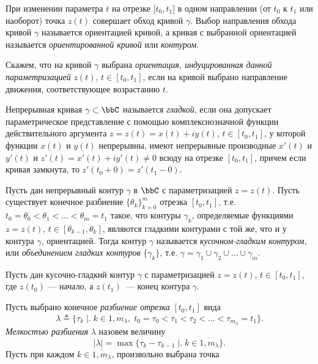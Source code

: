 При изменении параметра $t$ на отрезке $[t_0 , t_1$] в одном направлении (от $t_0$ к $t_1$ или наоборот) точка $z(t)$ совершает обход кривой $\gamma$. Выбор направления обхода кривой $\gamma$ называется ориентацией кривой, а кривая с выбранной ориентацией называется \textit{ориентированной кривой} или \textit{контуром}.

Скажем, что на кривой $\gamma$ выбрана \textit{ориентация, индуцированная данной параметризацией} $z(t)$, $t \in[t_0 , t_1]$, если на кривой выбрано направление движения, соответствующее возрастанию $t$. 

\begin{defn}
Непрерывная кривая $\gamma \subset \bbC$ называется \textit{гладкой}, если она допускает параметрическое представление с помощью комплекснозначной функции действительного аргумента $z = z(t) = x(t) + iy(t)$, $t \in [t_0 , t_1]$, у которой функции $x(t)$ и $y(t)$ непрерывны, имеют непрерывные производные $x'(t)$ и $y'(t)$ и $z'(t) = x'(t) +iy'(t) \ne 0$ всюду на отрезке $[t_0 , t_1]$, причем если кривая замкнута, то $z'(t_0 +0)= z'(t_1 - 0)$.
\end{defn}

\begin{defn}
Пусть дан непрерывный контур $\gamma$ в $\bbC$ с параметризацией $z =z(t)$. Пусть существует конечное разбиение $\{\theta_k\}^m_{k=0}$ отрезка $[t_0 , t_1]$, т.е. $t_0 = \theta_0 < \theta_1 < ... < \theta_m = t_1$ такое, что контуры $\gamma_k$, определяемые функциями $z = z(t)$, $t \in [\theta_{k-1}, \theta_k]$, являются гладкими контурами с той же, что и у контура $\gamma$, ориентацией. Тогда контур $\gamma$ называется \textit{кусочном-гладким контуром}, или \textit{объединением гладких контуров } $\{\gamma_k\}$, т.е. $\gamma = \gamma_1 \cup \gamma_2 \cup\dots \cup\gamma_m$. 
\end{defn}


Пусть дан кусочно-гладкий контур $\gamma$ с параметризацией $z=z(t)$, $t \in[t_0 , t_1]$, где $z(t_0)$ --- начало, а $z(t_1)$~--- конец контура $\gamma$. 

Пусть выбрано конечное \textit{разбиение отрезка} $[t_0, t_1]$ вида
\begin{equation}
\label{exp19}
\lambda \triangleq \{\tau_k\; \bigr|\bigl.\; k \in \overline{1,m_\lambda},\; t_0=\tau_0 < \tau_1 < \tau_2 < \dots < \tau_{m_\lambda} = t_1 \}.
\end{equation}
\textit{Мелкостъю разбиения} $\lambda$ назовем величину
$$
|\lambda| = \max \{\tau_k - \tau_{k-1} \; \bigr|\bigl.\; k \in \overline{1,m_\lambda}\}.
$$
Пусть при каждом $k \in \overline{1,m_\lambda}$, произвольно выбрана точка


